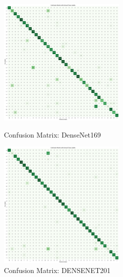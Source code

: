 \begin{figure}[h!]
    \centering
    \includegraphics[width=0.55\textwidth]{Assets/confusion_matrix/DenseNet169.png}
    \caption{Confusion Matrix: DenseNet169}
    \vspace{1.5cm}
    \includegraphics[width=0.55\textwidth]{Assets/confusion_matrix/DENSENET201.png}
    \caption{Confusion Matrix: DENSENET201}
\end{figure}

\newpage

